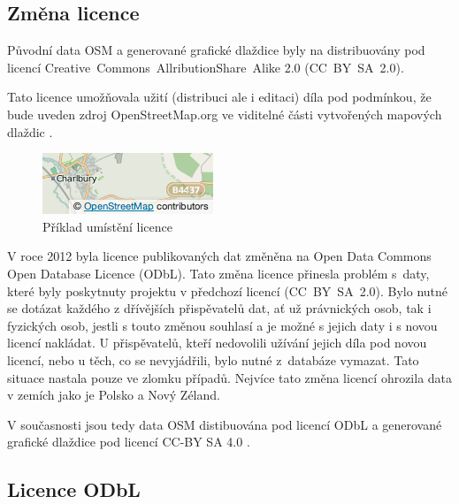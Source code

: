 \subsection{Změna licence}
\label{změna licence}

Původní data OSM a generované grafické dlaždice
byly na distribuovány pod licencí
Creative~Commons~AllributionShare~Alike 2.0 (CC~BY~SA~2.0).

Tato licence umožňovala užití (distribuci ale i editaci) díla pod podmínkou,
že bude uveden zdroj OpenStreetMap.org ve viditelné části
vytvořených mapových dlaždic \cite{OSMlicence}.

  \begin{figure}[hbt]
    \centering
      \includegraphics{./pictures/attribution_example.png}
      \caption{Příklad umístění licence}
      \label{fig:attribution_example}
  \end{figure} 

V roce 2012 byla licence publikovaných dat změněna na Open Data Commons
Open Database Licence (ODbL).
Tato změna licence přinesla problém
s~daty, které byly poskytnuty projektu v předchozí licencí
(CC~BY~SA~2.0). Bylo nutné se dotázat každého z dřívějších
přispěvatelů dat, ať už právnických osob, tak i fyzických osob, jestli
s touto změnou souhlasí a je možné s jejich daty i s novou licencí
nakládat. U přispěvatelů, kteří nedovolili užívání jejich díla
pod novou licencí, nebo u těch, co se nevyjádřili, bylo nutné
z~databáze vymazat. Tato situace nastala pouze ve zlomku případů.
Nejvíce tato změna licencí ohrozila data v zemích jako je Polsko a Nový Zéland.

V současnosti jsou tedy data OSM distibuována pod licencí ODbL a
generované grafické dlaždice pod licencí CC-BY SA 4.0
\cite {OSMlicenceIssue}.

\subsection{Licence ODbL}

